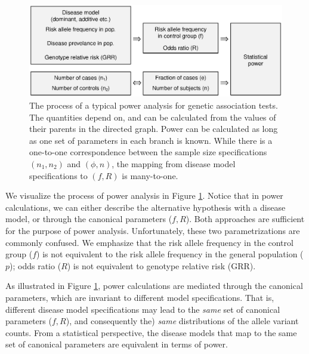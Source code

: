 \begin{figure}
    \centering
    \includegraphics[width=\textwidth]{figures/flowchart.eps}
    \caption{The process of a typical power analysis for genetic association tests.
    The quantities depend on, and can be calculated from the values of their parents in the directed graph. 
    Power can be calculated as long as one set of parameters in each branch is known.
    While there is a one-to-one correspondence between the sample size specifications $(n_1, n_2)$ and $(\phi, n)$, the mapping from disease model specifications to $(f, R)$ is many-to-one. 
    }
    \label{fig:flowchart}
\end{figure}

We visualize the process of power analysis in Figure \ref{fig:flowchart}.
Notice that in power calculations, we can either describe the alternative hypothesis with a disease model, or through the canonical parameters ($f, R$). 
Both approaches are sufficient for the purpose of power analysis.
Unfortunately, these two parametrizations are commonly confused.
We emphasize that the risk allele frequency in the control group ($f$) is not equivalent to the risk allele frequency in the general population ($p$); odds ratio ($R$) is not equivalent to genotype relative risk (GRR).

\bigskip

As illustrated in  Figure \ref{fig:flowchart}, power calculations are mediated through the canonical parameters, which are invariant to different model specifications.
That is, different disease model specifications may lead to the {\it same} set of canonical parameters ($f, R$), and consequently the) {\it same} distributions of the allele variant counts.
From a statistical perspective, the disease models that map to the same set of canonical parameters are equivalent in terms of power.

